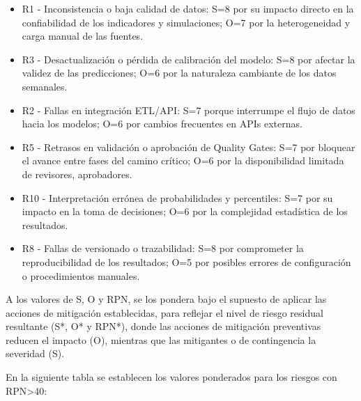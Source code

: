 \documentclass[12pt]
{charter}
\begin{document}
\begin{itemize}
  \item R1 - Inconsistencia o baja calidad de datos:
  S=8 por su impacto directo en la confiabilidad de los indicadores y simulaciones;
  O=7 por la heterogeneidad y carga manual de las fuentes.
  \item R3 - Desactualización o pérdida de calibración del modelo:
  S=8 por afectar la validez de las predicciones;
  O=6 por la naturaleza cambiante de los datos semanales.
  \item R2 - Fallas en integración ETL/API:
  S=7 porque interrumpe el flujo de datos hacia los modelos;
  O=6 por cambios frecuentes en APIs externas.
  \item R5 - Retrasos en validación o aprobación de Quality Gates:
  S=7 por bloquear el avance entre fases del camino crítico;
  O=6 por la disponibilidad limitada de revisores, aprobadores.
  \item R10 - Interpretación errónea de probabilidades y percentiles:
  S=7 por su impacto en la toma de decisiones;
  O=6 por la complejidad estadística de los resultados.
  \item R8 - Fallas de versionado o trazabilidad:
  S=8 por comprometer la reproducibilidad de los resultados;
  O=5 por posibles errores de configuración o procedimientos manuales.
\end{itemize}

A los valores de S, O y RPN, se los pondera bajo el supuesto de aplicar las acciones de mitigación establecidas, para reflejar el nivel de riesgo residual resultante (S*, O* y RPN*), donde las acciones de mitigación preventivas reducen el impacto (O), mientras que las mitigantes o de contingencia la severidad (S).

En la siguiente tabla se establecen los valores ponderados para los riesgos con RPN>40:
\end{document}
